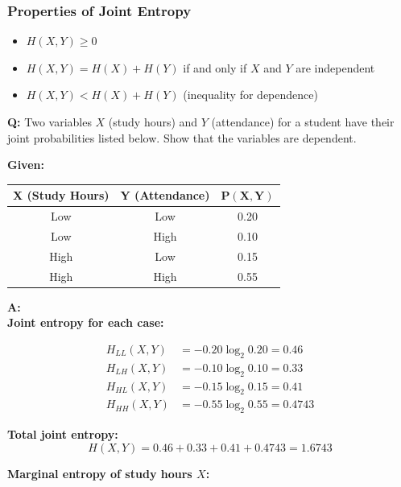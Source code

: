 \documentclass[11pt,a4paper]{book}
\newenvironment{infobox}[1][Information]{
    \begin{tcolorbox}[
        enhanced,
        breakable,
        colback=mintgreen!10,
        colframe=mintgreen!200,
        title=#1,
        fonttitle=\bfseries,
        sharp corners,
        boxrule=0.8pt,
        left=8pt,
        right=8pt,
        top=6pt,
        bottom=6pt
    ]
}{
    \end{tcolorbox}
}
\newcounter{qna}[chapter]
\renewcommand{\theqna}{\thechapter.\arabic{qna}}
\newenvironment{questionanswerbox}{
    \refstepcounter{qna}%
    \begin{tcolorbox}[
        enhanced,
        breakable,
        colback=softlavender!10,
        colframe=softlavender!200,
        title={Example~\theqna}, %
        fonttitle=\bfseries,
        coltitle=white,
        colbacktitle=softlavender!200,
        sharp corners,
        boxrule=1pt,
        left=8pt,
        right=8pt,
        top=6pt,
        bottom=6pt
    ]
}{
    \end{tcolorbox}
}
\begin{document}
\subsubsection{Properties of Joint Entropy}
\begin{infobox}[Properties of Joint Entropy]
    \begin{itemize}
        \item \(H(X,Y) \geq 0\)
        \item \(H(X,Y) = H(X) + H(Y)\) if and only if \(X\) and \(Y\) are independent
        \item \(H(X,Y) < H(X) + H(Y)\) (inequality for dependence)
    \end{itemize}
\end{infobox}

\begin{questionanswerbox}
\textbf{Q:} Two variables \(X\) (study hours) and \(Y\) (attendance) for a student have
their joint probabilities listed below. Show that the variables are dependent.

\medskip
\textbf{Given:}

\begin{center}
\begin{tabular}{|c|c|c|}
\hline
\textbf{X (Study Hours)} & \textbf{Y (Attendance)} & \(\mathbf{P(X,Y)}\) \\
\hline
Low  & Low  & 0.20 \\
Low  & High & 0.10 \\
High & Low  & 0.15 \\
High & High & 0.55 \\
\hline
\end{tabular}
\end{center}

\medskip
\textbf{A:}\\
\textbf{Joint entropy for each case:}

\begin{align*}
H_{LL}(X,Y) &= -0.20 \log_2 0.20 = 0.46 \\
H_{LH}(X,Y) &= -0.10 \log_2 0.10 = 0.33 \\
H_{HL}(X,Y) &= -0.15 \log_2 0.15 = 0.41 \\
H_{HH}(X,Y) &= -0.55 \log_2 0.55 = 0.4743
\end{align*}

\medskip
\textbf{Total joint entropy:}
\[
H(X,Y) = 0.46 + 0.33 + 0.41 + 0.4743 = 1.6743
\]

\medskip
\textbf{Marginal entropy of study hours \(X\):}


\end{questionanswerbox}
\end{document}
